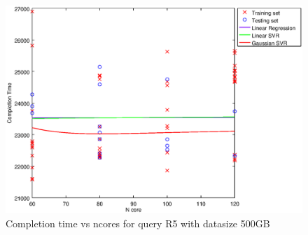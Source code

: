 
\begin {figure}[hbtp]
\centering
\includegraphics[width=\textwidth]{output/R5_500_1_OVER_NCORES/plot_R5_500_bestmodels.eps}
\caption{Completion time vs ncores for query R5 with datasize 500GB}
\label{fig:all_nonlinear_R5_500}
\end {figure}
